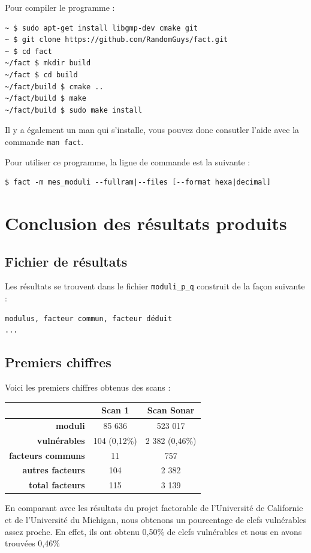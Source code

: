 \documentclass[a4paper,11pt,french]{article}
\begin{document}
Pour compiler le programme :
\begin{verbatim}
~ $ sudo apt-get install libgmp-dev cmake git 
~ $ git clone https://github.com/RandomGuys/fact.git
~ $ cd fact
~/fact $ mkdir build
~/fact $ cd build
~/fact/build $ cmake ..
~/fact/build $ make
~/fact/build $ sudo make install
\end{verbatim}

Il y a également un man qui s'installe, vous pouvez donc consutler l'aide avec la commande \verb+man fact+.

Pour utiliser ce programme, la ligne de commande est la suivante :
\begin{verbatim}
$ fact -m mes_moduli --fullram|--files [--format hexa|decimal]
\end{verbatim}


\section{Conclusion des résultats produits}

\subsection{Fichier de résultats}
Les résultats se trouvent dans le fichier \verb+moduli_p_q+ construit de la façon suivante :
\begin{verbatim}
modulus, facteur commun, facteur déduit
...
\end{verbatim}
\subsection{Premiers chiffres}
Voici les premiers chiffres obtenus des scans :
\begin{center}
\begin{tabular}{|r|c|c|}
\hline
\textbf{}&\textbf{Scan 1}&\textbf{Scan Sonar}\\
\hline
\textbf{moduli}&85 636&523 017\\
\hline
\textbf{vulnérables}&104 (0,12\%)&2 382 (0,46\%)\\
\hline
\textbf{facteurs communs}&11&757\\
\hline
\textbf{autres facteurs}&104&2 382\\
\hline
\textbf{total facteurs}&115&3 139\\
\hline
\end{tabular}
\end{center}

En comparant avec les résultats du projet factorable de l'Université de Californie et de l'Université du Michigan, nous obtenons un pourcentage de clefs vulnérables assez proche. En effet, ils ont obtenu 0,50\% de clefs vulnérables et nous en avons trouvées 0,46\% 
\end{document}
